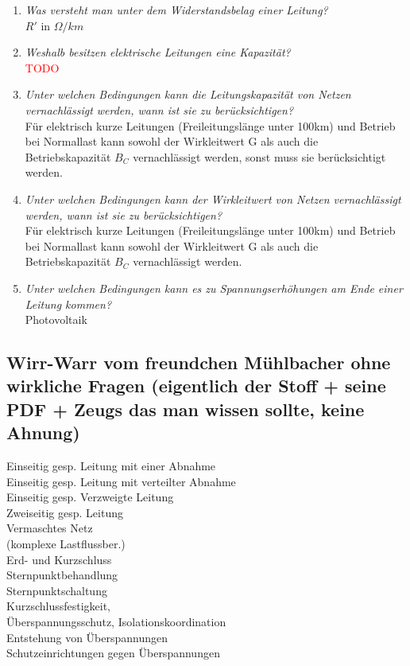 \documentclass[12pt]{article}
\begin{document}
\begin{enumerate}
    \item \textit{Was versteht man unter dem Widerstandsbelag 
    einer Leitung?}\\
    $R'$ in $\Omega / km$

    \item \textit{Weshalb besitzen elektrische Leitungen eine 
    Kapazität?}\\
    \textcolor{red}{TODO} 
    \item \textit{Unter welchen Bedingungen kann die 
    Leitungskapazität von Netzen vernachlässigt 
    werden, wann ist sie zu berücksichtigen?}\\
    Für elektrisch kurze Leitungen (Freileitungslänge unter 100km) und Betrieb bei 
    Normallast kann sowohl der Wirkleitwert G als auch die Betriebskapazität $B_C$
    vernachlässigt werden, sonst muss sie berücksichtigt werden.
    \item \textit{Unter welchen Bedingungen kann der Wirkleitwert 
    von Netzen vernachlässigt werden, wann ist sie zu 
    berücksichtigen?}\\
    Für elektrisch kurze Leitungen (Freileitungslänge unter 100km) und Betrieb bei 
    Normallast kann sowohl der Wirkleitwert G als auch die Betriebskapazität $B_C$
    vernachlässigt werden.
    \item \textit{Unter welchen Bedingungen kann es zu 
    Spannungserhöhungen am Ende einer Leitung 
    kommen?}\\
    Photovoltaik


\end{enumerate}





\subsection{Wirr-Warr vom freundchen Mühlbacher ohne wirkliche Fragen (eigentlich der Stoff + seine PDF + Zeugs das man wissen sollte, keine Ahnung)}



Einseitig gesp. Leitung mit einer Abnahme \\
Einseitig gesp. Leitung mit verteilter Abnahme \\
Einseitig gesp. Verzweigte Leitung \\
Zweiseitig gesp. Leitung \\
Vermaschtes Netz \\
(komplexe Lastflussber.) \\
Erd- und Kurzschluss \\
Sternpunktbehandlung \\
Sternpunktschaltung \\
Kurzschlussfestigkeit, \\
Überspannungsschutz, Isolationskoordination \\
Entstehung von Überspannungen \\
Schutzeinrichtungen gegen Überspannungen \\
\end{document}

